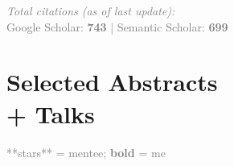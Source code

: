 \documentclass[10pt]{cooperCV2}
\begin{document}
\vspace{0.5cm}
\textcolor{grey}{
\textit{Total citations (as of last update):} \\
\textbf{\aiGoogleScholar} \hspace{0.05cm} Google Scholar: \textbf{743} | \textbf{\aiSemanticScholar} \hspace{0.05cm} Semantic Scholar: \textbf{699}\\
}





%	






\section{Selected Abstracts\\+ Talks}
\textcolor{grey}{**stars** = mentee; \textbf{bold} = me}\\
\end{document}

